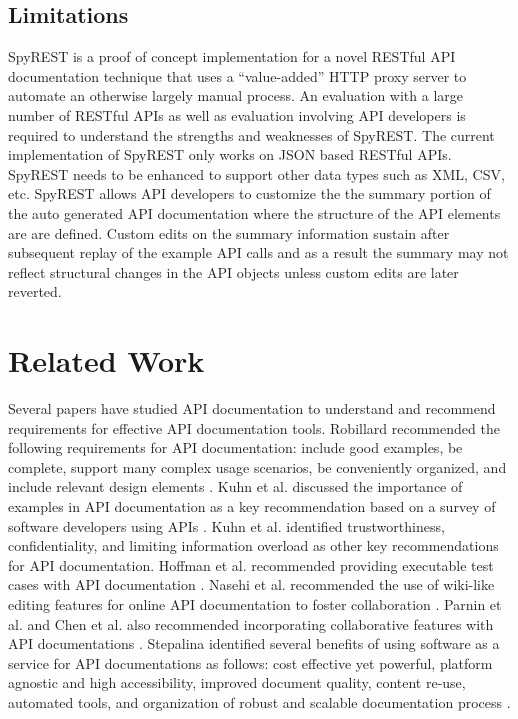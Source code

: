 \documentclass[conference]{IEEEtran}
\begin{document}
\subsection{Limitations} %
\label{sub:limitations}
SpyREST is a proof of concept implementation for a novel RESTful API documentation technique that uses a ``value-added'' HTTP proxy server to automate an otherwise largely manual process. An evaluation with a large number of RESTful APIs as well as evaluation involving API developers is required to understand the strengths and weaknesses of SpyREST. The current implementation of SpyREST only works on JSON based RESTful APIs. SpyREST needs to be enhanced to support other data types such as XML, CSV, etc. SpyREST allows API developers to customize the the summary portion of the auto generated API documentation where the structure of the API elements are are defined. Custom edits on the summary information sustain after subsequent replay of the example API calls and as a result the summary may not reflect structural changes in the API objects unless custom edits are later reverted.


\section{Related Work}
Several papers have studied API documentation to understand and recommend requirements for effective API documentation tools. Robillard recommended the following requirements for API documentation: include good examples, be complete, support many complex usage scenarios, be conveniently organized, and include relevant design elements \cite{Robillard_what_makes, Robillard_a_field_study}. Kuhn et al. discussed the importance of examples in API documentation as a key recommendation based on a survey of software developers using APIs \cite{Kuhn_on_designing}. Kuhn et al. identified trustworthiness, confidentiality, and limiting information overload as other key recommendations for API documentation. Hoffman et al. recommended providing executable test cases with API documentation \cite{Hoffman_api_documentation}. Nasehi et al. recommended the use of wiki-like editing features for online API documentation to foster collaboration \cite{Nasehi_what_makes}. Parnin et al. and Chen et al. also recommended incorporating collaborative features with API documentations \cite{Parnin_measuring, Chen_who_asked}. Stepalina identified several benefits of using software as a service for API documentations as follows: cost effective yet powerful, platform agnostic and high accessibility, improved document quality, content re-use, automated tools, and organization of robust and scalable documentation process \cite{Stepalina_saas}.
\end{document}
